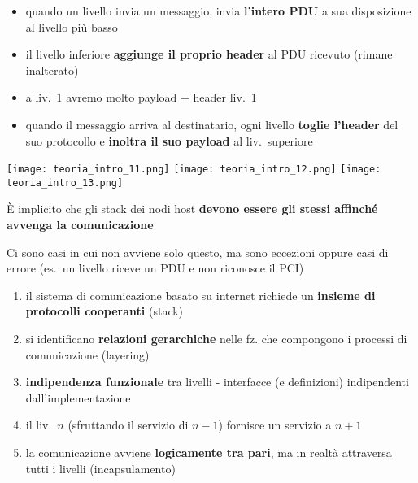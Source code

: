 \noindent\begin{minipage}[c]{.7\textwidth}
\begin{itemize}
  \item quando un livello invia un messaggio, invia \textbf{l'intero PDU} a sua disposizione al livello pi\`u basso
  \item il livello inferiore \textbf{aggiunge il proprio header} al PDU ricevuto (rimane inalterato)
  \item a liv.~1 avremo molto payload + header liv.~1
  \item quando il messaggio arriva al destinatario, ogni livello \textbf{toglie l'header} del suo protocollo e \textbf{inoltra il suo payload} al liv.~superiore
\end{itemize}
\end{minipage}\hfill
\begin{minipage}[c]{.25\textwidth}
\texttt{[image: teoria\_intro\_11.png]}
\texttt{[image: teoria\_intro\_12.png]}
\texttt{[image: teoria\_intro\_13.png]}
\end{minipage}

\begin{emphasize}
    \`E implicito che gli stack dei nodi host \textbf{devono essere gli stessi affinch\'e avvenga la comunicazione}
\end{emphasize}
\vspace{-5pt}
\begin{emphasize}
    Ci sono casi in cui non avviene solo questo, ma sono eccezioni oppure casi di errore (es.~un livello riceve un PDU e non riconosce il PCI)
\end{emphasize}

\begin{emphasize-blue}[frametitle={Sintesi sui protocolli}]
    \begin{enumerate}
      \item il sistema di comunicazione basato su internet richiede un \textbf{insieme di protocolli cooperanti} (stack)
      \item si identificano \textbf{relazioni gerarchiche} nelle fz. che compongono i processi di comunicazione (layering)
      \item \textbf{indipendenza funzionale} tra livelli - interfacce (e definizioni) indipendenti dall'implementazione
      \item il liv.~$n$ (sfruttando il servizio di $n-1$) fornisce un servizio a $n+1$
      \item la comunicazione avviene \textbf{logicamente tra pari}, ma in realt\`a attraversa tutti i livelli (incapsulamento)
    \end{enumerate}
\end{emphasize-blue}


